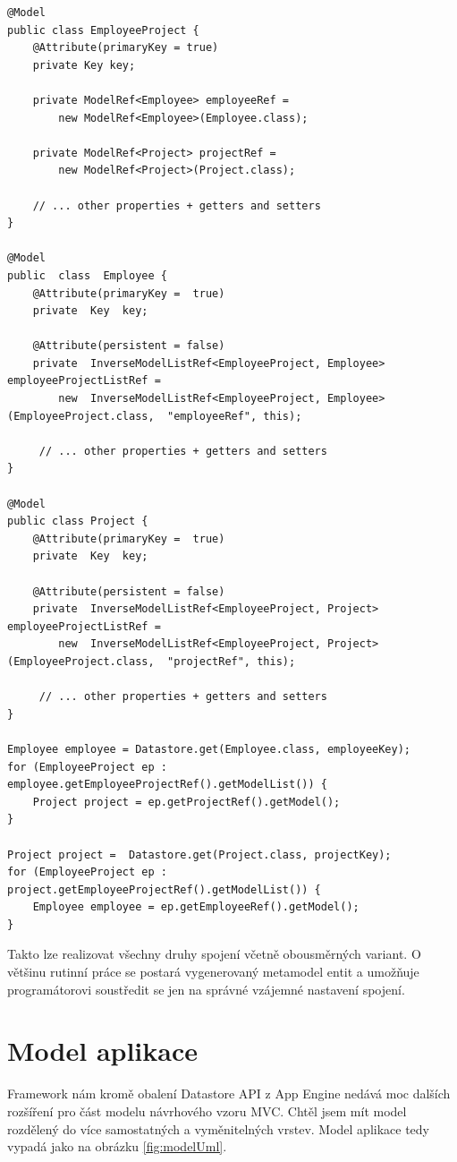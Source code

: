 \begin{lstlisting}[caption={Ukázka many-to-many vztahu s použitím spojovací entitní třídy},label=lst:manyToManyJoinTable,belowcaptionskip=0.4cm]
@Model
public class EmployeeProject {
	@Attribute(primaryKey = true)
	private Key key;

	private ModelRef<Employee> employeeRef = 
		new ModelRef<Employee>(Employee.class);

	private ModelRef<Project> projectRef = 
		new ModelRef<Project>(Project.class);

	// ... other properties + getters and setters
}

@Model
public  class  Employee {
	@Attribute(primaryKey =  true)
	private  Key  key;

	@Attribute(persistent = false)
	private  InverseModelListRef<EmployeeProject, Employee>  employeeProjectListRef =
		new  InverseModelListRef<EmployeeProject, Employee>(EmployeeProject.class,  "employeeRef", this);

     // ... other properties + getters and setters
}

@Model
public class Project {
	@Attribute(primaryKey =  true)
	private  Key  key;

	@Attribute(persistent = false)
	private  InverseModelListRef<EmployeeProject, Project>  employeeProjectListRef =
		new  InverseModelListRef<EmployeeProject, Project>(EmployeeProject.class,  "projectRef", this);

     // ... other properties + getters and setters
}

Employee employee = Datastore.get(Employee.class, employeeKey);
for (EmployeeProject ep : employee.getEmployeeProjectRef().getModelList()) {
	Project project = ep.getProjectRef().getModel();
}

Project project =  Datastore.get(Project.class, projectKey);
for (EmployeeProject ep : project.getEmployeeProjectRef().getModelList()) {
	Employee employee = ep.getEmployeeRef().getModel();
}
\end{lstlisting}

Takto lze realizovat všechny druhy spojení včetně obousměrných variant. O většinu rutinní práce se postará vygenerovaný metamodel entit a umožňuje programátorovi soustředit se jen na správné vzájemné nastavení spojení.

\section{Model aplikace}
Framework nám kromě obalení Datastore API z App Engine nedává moc dalších rozšíření pro část modelu návrhového vzoru MVC. Chtěl jsem mít model rozdělený do více samostatných a vyměnitelných vrstev. Model aplikace tedy vypadá jako na obrázku \ref{fig:modelUml}.

